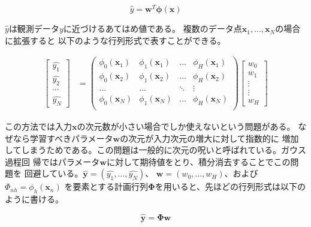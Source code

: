 \begin{equation}
\label{eq:liner-regression-model}
\hat{y} = \boldsymbol{w}^T\boldsymbol{\phi}(\boldsymbol{x})
\end{equation}

$\hat{y}$は観測データ$y$に近づけるあてはめ値である。
複数のデータ点$\boldsymbol{x}_{1}, ..., \boldsymbol{x}_{N}$の場合に拡張すると
以下のような行列形式で表すことができる。

\begin{align}
\begin{bmatrix}
	\hat{y_{1}} \\
	\hat{y_{2}} \\
	\cdots \\
	\hat{y_{N}}
\end{bmatrix}
&= \begin{pmatrix}
		\phi_{0}(\boldsymbol{x}_{1}) & \phi_{1}(\boldsymbol{x}_{1}) & \dots & \phi_{H}(\boldsymbol{x}_{1}) \\
		\phi_{0}(\boldsymbol{x}_{2}) & \phi_{1}(\boldsymbol{x}_{2}) & \dots & \phi_{H}(\boldsymbol{x}_{2}) \\
		\dots & \dots & \ddots & \vdots \\
		\phi_{0}(\boldsymbol{x}_{N}) & \phi_{1}(\boldsymbol{x}_{N}) & \dots & \phi_{H}(\boldsymbol{x}_{N}) \\
   \end{pmatrix}
   \begin{bmatrix}
	  w_{0} \\
	  w_{1} \\
	  \vdots \\
	  \vdots \\
	  w_{H}
   \end{bmatrix}
\end{align}

この方法では入力$\boldsymbol{x}$の次元数が小さい場合でしか使えないという問題がある。
なぜなら学習すべきパラメータ$\boldsymbol{w}$の次元が入力次元の増大に対して指数的に
増加してしまうためである。この問題は一般的に次元の呪いと呼ばれている。ガウス過程回
帰ではパラメータ$\boldsymbol{w}$に対して期待値をとり、積分消去することでこの問題を
回避している。$\boldsymbol{\hat{y}} = (\hat{y_{1}}, ..., \hat{y_{N}})$、
$\boldsymbol{w} = (w_{0}, ..., w_{H})$、および$\Phi_{nh} = \phi_{h}(\boldsymbol{x}_{n})$
を要素とする計画行列$\boldsymbol{\Phi}$を用いると、先ほどの行列形式は以下のように書ける。

\begin{equation}\label{eq:y-equals-phi-w}
\boldsymbol{\hat{y}} = \boldsymbol{\Phi}\boldsymbol{w}
\end{equation}


